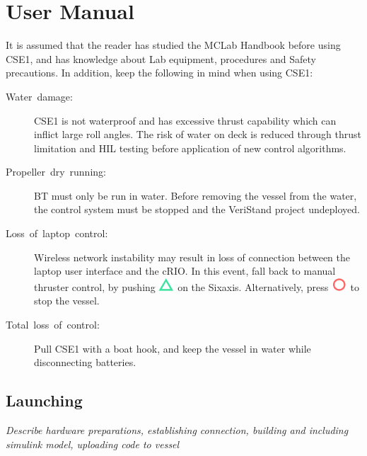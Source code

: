 \part{User Manual}\label{part2}
\noindent
It is assumed that the reader has studied the MCLab Handbook before using CSE1, and has knowledge about Lab equipment, procedures and Safety precautions. In addition, keep the following in mind when using CSE1:
\begin{description}
	\item [{Water~damage:}] CSE1 is not waterproof and has excessive thrust capability which can inflict large roll angles. The risk of water on deck is reduced through thrust limitation and HIL testing before application of new control algorithms. 
	\item [{Propeller~dry~running:}] BT must only be run in water. Before removing the vessel from the water, the control system must be stopped and the VeriStand project undeployed.
	\item [{Loss~of~laptop~control:}] Wireless network instability may result in loss of connection between the laptop user interface and the cRIO. In this event, fall back to manual thruster control, by pushing \includegraphics[scale=0.4]{fig/sixaxis_triangle} on the Sixaxis. Alternatively, press \includegraphics[scale=0.4]{fig/sixaxis_circle} to stop the vessel.
	\item [{Total~loss~of~control:}] Pull CSE1 with a boat hook, and keep the vessel in water while disconnecting batteries.
\end{description}
\chapter{Launching}
\textit{Describe hardware preparations, establishing connection, building and including simulink model, uploading code to vessel}
